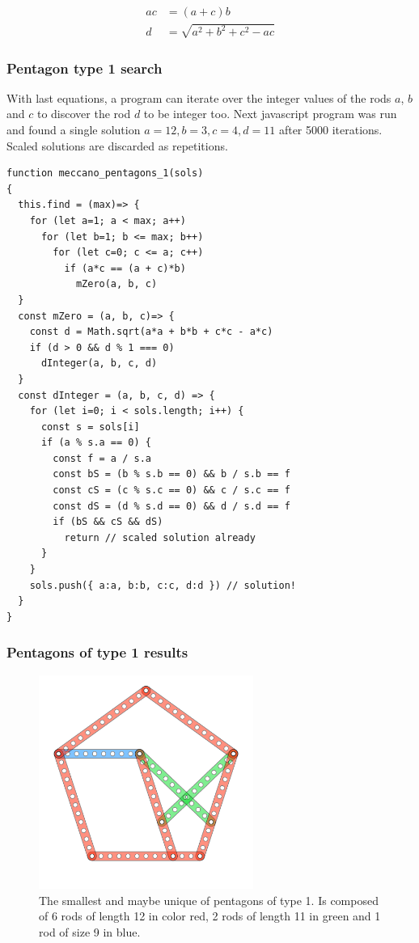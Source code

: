 \documentclass[11pt]{article}
\begin{document}
\begin{align*}
ac &= (a + c)b \\
d &= \sqrt{ a^2 + b^2 + c^2 - ac }
\end{align*}

\subsubsection{Pentagon type 1 search}

With last equations, a program can iterate over the integer values of the rods $a$, $b$ and $c$ to discover the rod $d$ to be integer too. Next javascript program was run and found a single solution $a = 12, b = 3, c = 4, d = 11$ after 5000 iterations. Scaled solutions are discarded as repetitions.

\begin{lstlisting}
function meccano_pentagons_1(sols)
{
  this.find = (max)=> {
    for (let a=1; a < max; a++)
      for (let b=1; b <= max; b++)
        for (let c=0; c <= a; c++)
          if (a*c == (a + c)*b)
            mZero(a, b, c)
  }
  const mZero = (a, b, c)=> {
    const d = Math.sqrt(a*a + b*b + c*c - a*c)
    if (d > 0 && d % 1 === 0)
      dInteger(a, b, c, d)
  }
  const dInteger = (a, b, c, d) => {
    for (let i=0; i < sols.length; i++) {
      const s = sols[i]
      if (a % s.a == 0) {
        const f = a / s.a
        const bS = (b % s.b == 0) && b / s.b == f
        const cS = (c % s.c == 0) && c / s.c == f
        const dS = (d % s.d == 0) && d / s.d == f
        if (bS && cS && dS)
          return // scaled solution already
      }
    }
    sols.push({ a:a, b:b, c:c, d:d }) // solution!
  }
}

\end{lstlisting}

\subsubsection{Pentagons of type 1 results}

\begin{figure}
\centering
\includegraphics[width=7cm]{figs/pentagon-12a}
\caption{The smallest and maybe unique of pentagons of type 1. Is composed of 6 rods of
length 12 in color red, 2 rods of length 11 in green and 1 rod of size 9 in blue.}
\label{pentagon-12a}
\end{figure}
\end{document}
